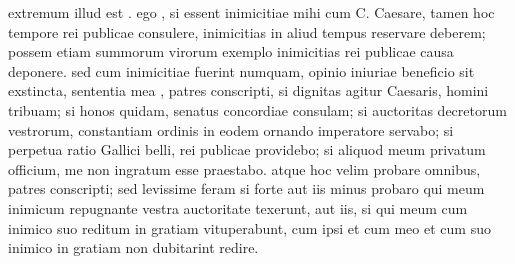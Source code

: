  extremum illud est . ego , si essent inimicitiae mihi cum C. Caesare, tamen hoc tempore rei publicae consulere, inimicitias in aliud tempus reservare deberem; possem etiam summorum virorum exemplo inimicitias rei publicae causa deponere. sed cum inimicitiae fuerint numquam, opinio iniuriae beneficio sit exstincta, sententia mea , patres conscripti, si dignitas agitur Caesaris, homini tribuam; si honos quidam, senatus concordiae consulam; si auctoritas decretorum vestrorum, constantiam ordinis in eodem ornando imperatore servabo; si perpetua ratio Gallici belli, rei publicae providebo; si aliquod meum privatum officium, me non ingratum esse praestabo. atque hoc velim probare omnibus, patres conscripti; sed levissime feram si forte aut iis minus probaro qui meum inimicum repugnante vestra auctoritate texerunt, aut iis, si qui meum cum inimico suo reditum in gratiam vituperabunt, cum ipsi et cum meo et cum suo inimico in gratiam non dubitarint redire.
